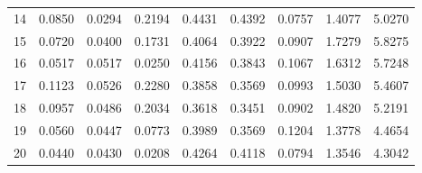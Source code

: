 \begin{anexosenv}
\begin{table}[htbp!]
\begin{tabular}{|l|l|l|l|l|l|l|l|l|}
14   & 0.0850 & 0.0294   & 0.2194               & 0.4431 & 0.4392   & 0.0757               & 1.4077  & 5.0270               \\
15   & 0.0720 & 0.0400   & 0.1731               & 0.4064 & 0.3922   & 0.0907               & 1.7279  & 5.8275               \\
16   & 0.0517 & 0.0517   & 0.0250               & 0.4156 & 0.3843   & 0.1067               & 1.6312  & 5.7248               \\
17   & 0.1123 & 0.0526   & 0.2280               & 0.3858 & 0.3569   & 0.0993               & 1.5030  & 5.4607               \\
18   & 0.0957 & 0.0486   & 0.2034               & 0.3618 & 0.3451   & 0.0902               & 1.4820  & 5.2191               \\
19   & 0.0560 & 0.0447   & 0.0773               & 0.3989 & 0.3569   & 0.1204               & 1.3778  & 4.4654               \\
20   & 0.0440 & 0.0430   & 0.0208               & 0.4264 & 0.4118   & 0.0794               & 1.3546  & 4.3042              \\\hline
\end{tabular}
\end{table}



\end{anexosenv}
